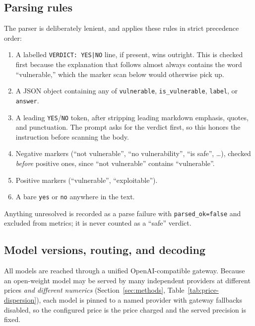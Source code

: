 \documentclass[computers,article,submit,moreauthors]{Definitions/mdpi}
\begin{document}
\subsection[\appendixname~\thesubsection]{Parsing rules}
The parser is deliberately lenient, and applies these rules in strict precedence order:
\begin{enumerate}
\item A labelled \texttt{VERDICT:\ YES|NO} line, if present, wins outright. This is checked first because the explanation that follows almost always contains the word ``vulnerable,'' which the marker scan below would otherwise pick up.
\item A JSON object containing any of \texttt{vulnerable}, \texttt{is\_vulnerable}, \texttt{label}, or \texttt{answer}.
\item A leading \texttt{YES}/\texttt{NO} token, after stripping leading markdown emphasis, quotes, and punctuation. The prompt asks for the verdict first, so this honors the instruction before scanning the body.
\item Negative markers (``not vulnerable'', ``no vulnerability'', ``is safe'', \dots), checked \emph{before} positive ones, since ``not vulnerable'' contains ``vulnerable''.
\item Positive markers (``vulnerable'', ``exploitable'').
\item A bare \texttt{yes} or \texttt{no} anywhere in the text.
\end{enumerate}
Anything unresolved is recorded as a parse failure with \texttt{parsed\_ok=false} and excluded from metrics; it is never counted as a ``safe'' verdict.

\subsection[\appendixname~\thesubsection]{Model versions, routing, and decoding}
All models are reached through a unified OpenAI-compatible gateway. Because an open-weight model may be served by many independent providers at different prices \emph{and different numerics} (Section~\ref{sec:methods}, Table~\ref{tab:price-dispersion}), each model is pinned to a named provider with gateway fallbacks disabled, so the configured price is the price charged and the served precision is fixed.
\end{document}
